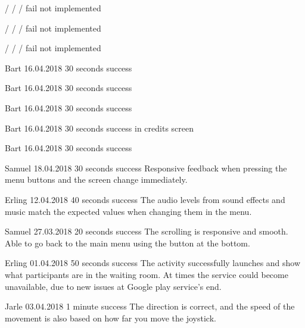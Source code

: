 {/}
{/}
{/}
{fail}
{not implemented}

{/}
{/}
{/}
{fail}
{not implemented}

{/}
{/}
{/}
{fail}
{not implemented}

{Bart}
{16.04.2018}
{30 seconds}
{success}
{}

{Bart}
{16.04.2018}
{30 seconds}
{success}
{}


{Bart}
{16.04.2018}
{30 seconds}
{success}
{}

{Bart}
{16.04.2018}
{30 seconds}
{success}
{in credits screen}

{Bart}
{16.04.2018}
{30 seconds}
{success}
{}

{Samuel}
{18.04.2018}
{30 seconds}
{success}
{Responsive feedback when pressing the menu buttons and the screen change immediately.}

{Erling}
{12.04.2018}
{40 seconds}
{success}
{The audio levels from sound effects and music match the expected values when changing them in the menu.}

{Samuel}
{27.03.2018}
{20 seconds}
{success}
{The scrolling is responsive and smooth. Able to go back to the main menu using the button at the bottom.}

{Erling}
{01.04.2018}
{50 seconds}
{success}
{The activity successfully launches and show what participants are in the waiting room. At times the service could become unavailable, due to new issues at Google play service’s end.}

{Jarle}
{03.04.2018}
{1 minute}
{success}
{The direction is correct, and the speed of the movement is also based on how far you move the joystick.}

